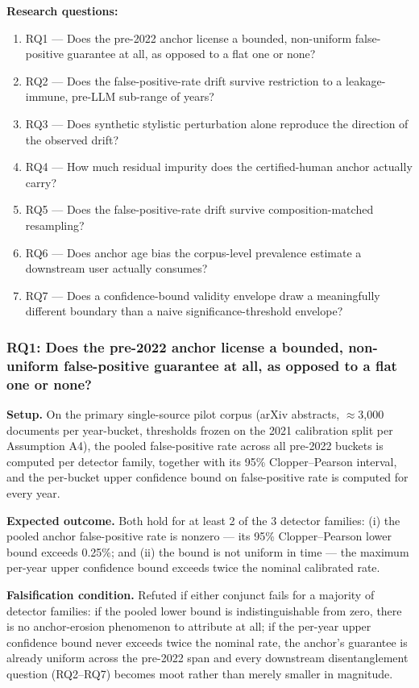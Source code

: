 \documentclass[11pt]{article}
\begin{document}
\textbf{Research questions:}
\begin{enumerate}[leftmargin=1.6em]
\item RQ1 --- Does the pre-2022 anchor license a bounded, non-uniform false-positive guarantee at all, as opposed to a flat one or none?
\item RQ2 --- Does the false-positive-rate drift survive restriction to a leakage-immune, pre-LLM sub-range of years?
\item RQ3 --- Does synthetic stylistic perturbation alone reproduce the direction of the observed drift?
\item RQ4 --- How much residual impurity does the certified-human anchor actually carry?
\item RQ5 --- Does the false-positive-rate drift survive composition-matched resampling?
\item RQ6 --- Does anchor age bias the corpus-level prevalence estimate a downstream user actually consumes?
\item RQ7 --- Does a confidence-bound validity envelope draw a meaningfully different boundary than a naive significance-threshold envelope?
\end{enumerate}

\subsubsection{RQ1: Does the pre-2022 anchor license a bounded, non-uniform false-positive guarantee at all, as opposed to a flat one or none?}
\textbf{Setup.} On the primary single-source pilot corpus (arXiv abstracts, $\approx$3,000 documents per year-bucket, thresholds frozen on the 2021 calibration split per Assumption A4), the pooled false-positive rate across all pre-2022 buckets is computed per detector family, together with its 95\% Clopper--Pearson interval, and the per-bucket upper confidence bound on false-positive rate is computed for every year.

\textbf{Expected outcome.} Both hold for at least 2 of the 3 detector families: (i) the pooled anchor false-positive rate is nonzero --- its 95\% Clopper--Pearson lower bound exceeds 0.25\%; and (ii) the bound is not uniform in time --- the maximum per-year upper confidence bound exceeds twice the nominal calibrated rate.

\textbf{Falsification condition.} Refuted if either conjunct fails for a majority of detector families: if the pooled lower bound is indistinguishable from zero, there is no anchor-erosion phenomenon to attribute at all; if the per-year upper confidence bound never exceeds twice the nominal rate, the anchor's guarantee is already uniform across the pre-2022 span and every downstream disentanglement question (RQ2--RQ7) becomes moot rather than merely smaller in magnitude.
\end{document}
